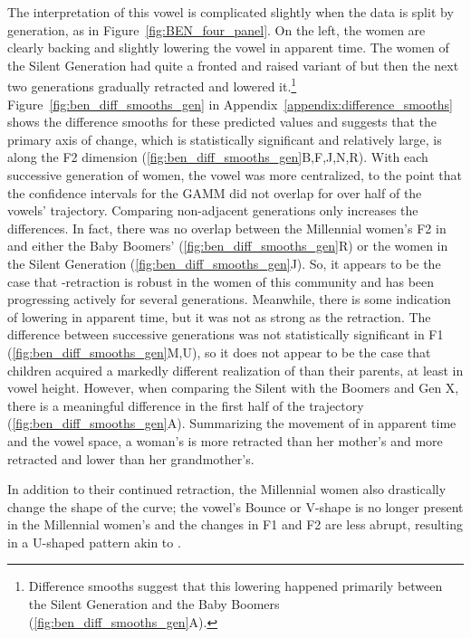The interpretation of this vowel is complicated slightly when the data is split by generation, as in Figure~\ref{fig:BEN_four_panel}. On the left, the women are clearly backing and slightly lowering the vowel in apparent time. The women of the Silent Generation had quite a fronted and raised variant of \ben but then the next two generations gradually retracted and lowered it.\footnote{Difference smooths suggest that this lowering happened primarily between the Silent Generation and the Baby Boomers (\ref{fig:ben_diff_smooths_gen}A).} Figure~\ref{fig:ben_diff_smooths_gen} in Appendix~\ref{appendix:difference_smooths} shows the difference smooths for these predicted values and suggests that the primary axis of change, which is statistically significant and relatively large, is along the F2 dimension (\ref{fig:ben_diff_smooths_gen}B,F,J,N,R). With each successive generation of women, the vowel was more centralized, to the point that the confidence intervals for the GAMM did not overlap for over half of the vowels' trajectory. Comparing non-adjacent generations only increases the differences. In fact, there was no overlap between the Millennial women's F2 in \ben and either the Baby Boomers' (\ref{fig:ben_diff_smooths_gen}R) or the women in the Silent Generation (\ref{fig:ben_diff_smooths_gen}J). So, it appears to be the case that \ben-retraction is robust in the women of this community and has been progressing actively for several generations. Meanwhile, there is some indication of \ben lowering in apparent time, but it was not as strong as the retraction. The difference between successive generations was not statistically significant in F1 (\ref{fig:ben_diff_smooths_gen}M,U), so it does not appear to be the case that children acquired a markedly different realization of \ben than their parents, at least in vowel height. However, when comparing the Silent with the Boomers and Gen X, there is a meaningful difference in the first half of the trajectory (\ref{fig:ben_diff_smooths_gen}A). Summarizing the movement of \ben in apparent time and the vowel space, a woman's \ben is more retracted than her mother's and more retracted and lower than her grandmother's.

In addition to their continued retraction, the Millennial women also drastically change the shape of the curve; the vowel's Bounce or V-shape is no longer present in the Millennial women's \bet and the changes in F1 and F2 are less abrupt, resulting in a U-shaped pattern akin to \bet.

